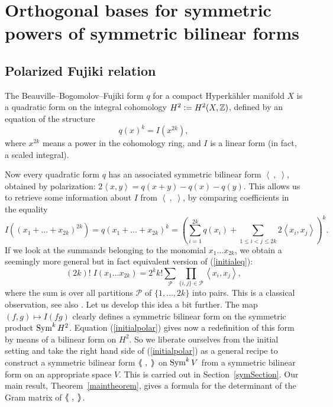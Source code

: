 \chapter{Orthogonal bases for symmetric powers of symmetric bilinear forms}
\renewcommand{\G}{\mathbb{G}}
\section{Polarized Fujiki relation}\label{SymIntro}
The Beauville--Bogomolov--Fujiki form $q$ for a compact Hyperk\"ahler manifold $X$ is a quadratic form on the integral cohomology $H^2\vcentcolon= H^2(X,\mathbb{Z})$, defined by an equation of the structure
\begin{equation} \label{initialeq}
q(x)^k = I(x^{2k}),
\end{equation}
where $x^{2k}$ means a power in the cohomology ring, and $I$ is a linear form (in fact, a scaled integral). 

Now every quadratic form $q$ has an associated symmetric bilinear form $\left<\ ,\;\right>$, obtained by polarization: $2\left<x,y\right> = q(x+y)-q(x)-q(y)$. This allows us to retrieve some information about $I$ from $\left<\ ,\;\right>$,
by comparing coefficients in the equality
\begin{equation*}
I\!\left((x_1+\ldots+x_{2k})^{2k}\right) = q(x_1+\ldots+x_{2k})^{k} = \left(\sum\limits_{i=1}^{2k} q(x_i) +\!\!\!\sum\limits_{1\leq i<j\leq 2k}\!\!2 \left<x_i,x_j\right>  \right)^k.
\end{equation*}
If we look at the summands belonging to the monomial $x_1\ldots x_{2k}$, we obtain a seemingly more general but in fact equivalent version of (\ref{initialeq}):
\begin{equation} \label{initialpolar}
 (2k)!\; I\!\left(x_1\ldots x_{2k}\right) = 2^k k!\sum_{\mathcal{P}} \prod_{\{i,j\}\in\mathcal{P}}\left<x_i,x_j\right>,
\end{equation}
where the sum is over all partitions $\mathcal{P}$ of $\{1,\ldots,2k\}$ into pairs. This is a classical observation, see also \cite[Eq.~3.2.4]{OGrady}. Let us develop this idea a bit further. The map $(f,g) \mapsto I(fg)$ clearly defines a symmetric bilinear form on the symmetric product $\operatorname{Sym}^kH^2$.
Equation (\ref{initialpolar}) gives now a redefinition of this form by means of a bilinear form on $H^2$. So we liberate ourselves from the initial setting and take the right hand side of (\ref{initialpolar}) as a general recipe to construct a symmetric bilinear form $\bra\ ,\;\ket$ on $\operatorname{Sym}^kV$ from a symmetric bilinear form on an appropriate space $V$. This is carried out in Section~\ref{symSection}. Our main result, Theorem~\ref{maintheorem}, gives a formula for the determinant of the Gram matrix of $\bra\ ,\;\ket$. 

